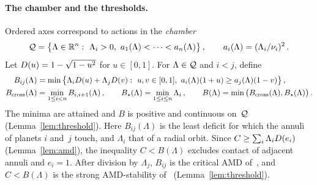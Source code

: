 \paragraph{The chamber and the thresholds.} Ordered axes correspond to actions in the \emph{chamber}
\begin{equation}\label{eq:chamber}
\Ach=\big\{\Lambda\in\R^n:\ \Lambda_i>0,\ a_1(\Lambda)<\cdots<a_n(\Lambda)\big\}\,,\qquad a_i(\Lambda)=(\nf{\Lambda_i}{\nu_i})^2\,.
\end{equation}
Let $D(u)=1-\sqrt{1-u^2}$ for $u\in[0,1]$. For $\Lambda\in\mathcal{Q}$ and $i<j$, define
\begin{equation}\label{eq:thresholds}
\begin{aligned}
B_{ij}(\Lambda)&=\min\big\{\Lambda_i\Dfn(u)+\Lambda_j\Dfn(v):\ u,v\in[0,1],\ a_i(\Lambda)(1+u)\geq a_j(\Lambda)(1-v)\big\}\,,\\
\Bcross(\Lambda)&=\min_{1\leq i<n}B_{i,i+1}(\Lambda)\,,\qquad \Bst(\Lambda)=\min_{1\leq i\leq n}\Lambda_i\,,\qquad B(\Lambda)=\min\big(\Bcross(\Lambda),\Bst(\Lambda)\big)\,.
\end{aligned}
\end{equation}
The minima are attained and $B$ is positive and continuous on~$\mathcal{Q}$ (Lemma~\ref{lem:threshold}). Here $B_{ij}(\Lambda)$ is the least deficit for which the annuli of planets $i$ and~$j$ touch, and $\Lambda_i$ that of a radial orbit. Since $C\geq\sum_i\Lambda_iD(e_i)$ (Lemma~\ref{lem:amd}), the inequality $C<B(\Lambda)$ excludes contact of adjacent annuli and $e_i=1$. After division by $\Lambda_j$, $B_{ij}$ is the critical AMD of~\cite[\S3.2]{LP17}, and $C<B(\Lambda)$ is the strong AMD-stability of~\cite[\S5 and \S5.3]{LP17} (Lemma~\ref{lem:threshold}).

